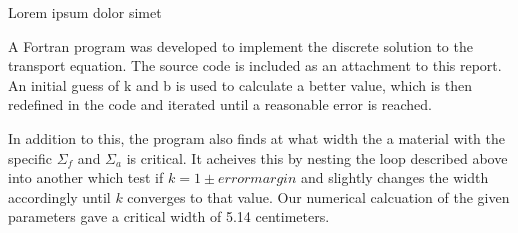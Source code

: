 \documentclass[../main.tex]{subfiles}
\begin{document}
Lorem ipsum dolor simet

A Fortran program was developed to implement the discrete solution to the transport equation. The source code is included as an attachment to this report. An initial guess of k and b is used to calculate a better value, which is then redefined in the code and iterated until a reasonable error is reached.

In addition to this, the program also finds at what width the a material with the specific $\Sigma_f$ and $\Sigma_a$ is critical. It acheives this by nesting the loop described above into another which test if $k = 1 \pm error margin$ and slightly changes the width accordingly until $k$ converges to that value. Our numerical calcuation of the given parameters gave a critical width of 
5.14 centimeters. 
	
\end{document}
